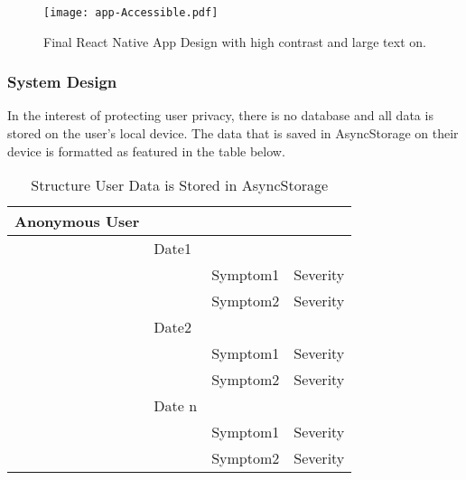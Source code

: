 \begin{figure}[h!!]
  \begin{center}
    \texttt{[image: app-Accessible.pdf]}
    \caption{Final React Native App Design with high contrast and large text on.}
    \label{figure:app-Accessible}
  \end{center}
\end{figure}

\subsubsection{System Design}
In the interest of protecting user privacy, there is no database and all data is stored on the user's local device. The data that is saved in AsyncStorage on their device is formatted as featured in the table below.

  \begin{table}[h!!]
    \caption{Structure User Data is Stored in AsyncStorage}
    \label{table:user-data}
    \begin{tabular}{llll}
    \hline
    Anonymous User &        &          &          \\ \hline
                  & Date1  &          &          \\
                  &        & Symptom1 & Severity \\
                  &        & Symptom2 & Severity \\
                  & Date2  &          &          \\
                  &        & Symptom1 & Severity \\
                  &        & Symptom2 & Severity \\
                  & Date n &          &          \\
                  &        & Symptom1 & Severity \\
                  &        & Symptom2 & Severity \\ \hline
    \end{tabular}
    \end{table}